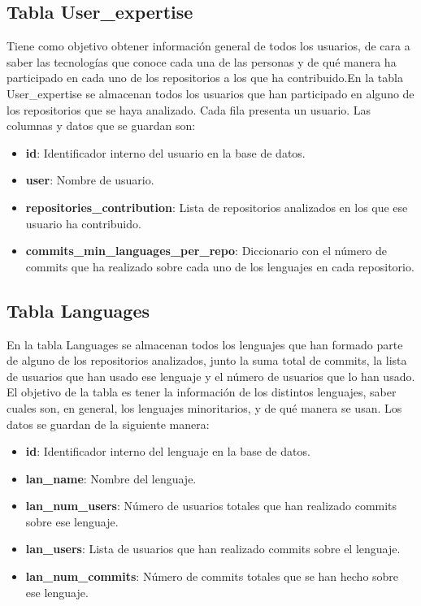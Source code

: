 \documentclass[a4paper, 12pt]{book}
\begin{document}
\subsection{Tabla User\_expertise}
\label{subsec:Tabla User\_expertise}

Tiene como objetivo obtener información general de todos los usuarios, de cara a saber las tecnologías que conoce cada una de las personas y de qué manera ha participado en cada uno de los repositorios a los que ha contribuido.En la tabla User\_expertise se almacenan todos los usuarios que han participado en alguno de los repositorios que se haya analizado. Cada fila presenta un usuario. Las columnas y datos que se guardan son:

\begin{itemize}
  \item \textbf{id}: Identificador interno del usuario en la base de datos.
  \item \textbf{user}: Nombre de usuario.
  \item \textbf{repositories\_contribution}: Lista de repositorios analizados en los que ese usuario ha contribuido.
  \item \textbf{commits\_min\_languages\_per\_repo}: Diccionario con el número de commits que ha realizado sobre cada uno de los lenguajes en cada repositorio.
\end{itemize}

\subsection{Tabla Languages}
\label{subsec:Tabla Languages}

En la tabla Languages se almacenan todos los lenguajes que han formado parte de alguno de los repositorios analizados, junto la suma total de commits, la lista de usuarios que han usado ese lenguaje y el número de usuarios que lo han usado. El objetivo de la tabla es tener la información de los distintos lenguajes, saber cuales son, en general, los lenguajes minoritarios, y de qué manera se usan. Los datos se guardan de la siguiente manera:

\begin{itemize}
  \item \textbf{id}: Identificador interno del lenguaje en la base de datos.
  \item \textbf{lan\_name}: Nombre del lenguaje.
  \item \textbf{lan\_num\_users}: Número de usuarios totales que han realizado commits sobre ese lenguaje.
  \item \textbf{lan\_users}: Lista de usuarios que han realizado commits sobre el lenguaje.
  \item \textbf{lan\_num\_commits}: Número de commits totales que se han hecho sobre ese lenguaje.
\end{itemize}
\end{document}
